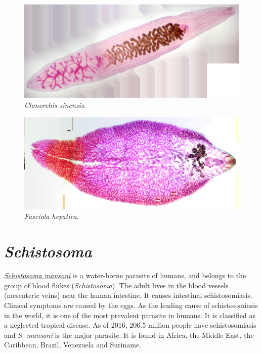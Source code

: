 \begin{figure}

{\centering \includegraphics[width=0.7\linewidth]{./figures/rotifera/clonorchis_sinensis_wm}

}

\caption{\emph{Clonorchis sinensis}.}\label{fig:clonorchis}
\end{figure}

\begin{figure}

{\centering \includegraphics[width=0.7\linewidth]{./figures/rotifera/fasciola_hepatica}

}

\caption{\emph{Fasciola hepatica}.}\label{fig:fasciola}
\end{figure}

\section{\texorpdfstring{
\emph{Schistosoma}}{Schistosoma}}\label{Schistosoma}


\href{https://en.wikipedia.org/wiki/Schistosoma_mansoni}{\emph{Schistosoma
mansoni}} is a water-borne parasite of humans, and belongs to the group
of blood flukes (\emph{Schistosoma}). The adult lives in the blood vessels
(mesenteric veins) near the human intestine. It causes intestinal
schistosomiasis. Clinical symptoms are caused by the eggs. As the
leading cause of schistosomiasis in the world, it is one of the most prevalent
parasite in humans. It is classified as a neglected tropical disease. As
of 2016, 206.5 million people have schistosomiasis and \emph{S. mansoni} is the
major parasite. It is found in Africa, the Middle East, the Caribbean,
Brazil, Venezuela and Suriname.

